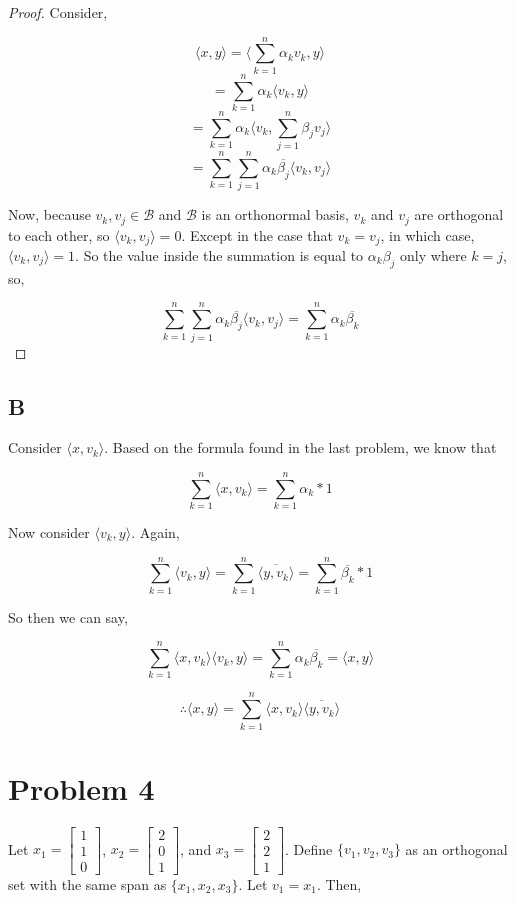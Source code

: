 \documentclass{article}
\begin{document}
\begin{proof}
Consider,

\[ \langle x, y \rangle = \langle \sum^n_{k=1} \alpha_k v_k, y \rangle \] 
\[ = \sum^n_{k=1} \alpha_k \langle v_k, y \rangle \]
\[ = \sum^n_{k=1} \alpha_k \langle v_k, \sum^n_{j=1} \beta_j v_j \rangle \]
\[ = \sum^n_{k=1} \sum^n_{j=1} \alpha_k \overline{\beta_j} \langle v_k, v_j \rangle \]

Now, because $v_k, v_j \in \mathcal{B}$ and $\mathcal{B}$ is an orthonormal basis, $v_k$ and $v_j$ are orthogonal to each other, so $\langle v_k, v_j \rangle = 0$. Except in the case that $v_k = v_j$, in which case, $\langle v_k, v_j \rangle = 1$. So the value inside the summation is equal to $\alpha_k \beta_j$ only where $k = j$, so,

\[ \sum^n_{k=1} \sum^n_{j=1} \alpha_k \overline{\beta_j} \langle v_k, v_j \rangle = \sum_{k=1}^n \alpha_k \overline{\beta_k} \]

\end{proof} 

\subsection*{B}
Consider $\langle x, v_k \rangle$. Based on the formula found in the last problem, we know that

\[ \sum^n_{k=1} \langle x, v_k \rangle = \sum^n_{k=1} \alpha_k * 1 \]

Now consider $\langle v_k, y \rangle$. Again,

\[ \sum^n_{k=1} \langle v_k, y \rangle = \sum^n_{k=1} \overline{\langle y, v_k \rangle} = \sum^n_{k=1} \overline{\beta_k} * 1 \]

So then we can say,

\[ \sum^n_{k=1} \langle x, v_k \rangle \langle v_k, y \rangle = \sum^n_{k=1} \alpha_k \overline{\beta_k} = \langle x, y \rangle \]

\[ \therefore \langle x, y \rangle = \sum^n_{k=1} \langle x, v_k \rangle \overline{ \langle y, v_k \rangle} \]

\section*{Problem 4}
Let $x_1 = \begin{bmatrix} 1 \\ 1 \\ 0 \end{bmatrix}$, $x_2 = \begin{bmatrix} 2 \\ 0 \\ 1 \end{bmatrix}$, and $x_3 = \begin{bmatrix} 2 \\ 2 \\ 1 \end{bmatrix}$. Define $\{v_1, v_2, v_3\}$ as an orthogonal set with the same span as $\{x_1, x_2, x_3\}$. Let $v_1 = x_1$. Then,
\end{document}

